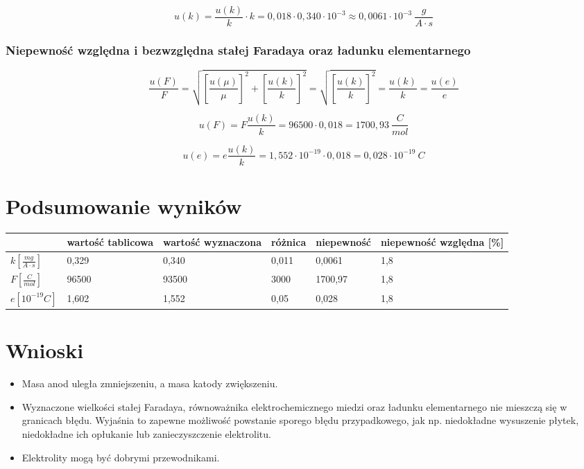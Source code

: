 \documentclass[a4paper,11pt]{article}
\begin{document}
$$
u(k) = \frac{u(k)}{k} \cdot k =  0,018 \cdot 0,340 \cdot 10^{-3} \approx 0,0061 \cdot 10^{-3} ~ \frac{g}{A \cdot s}
$$

\subsubsection*{Niepewność względna i bezwzględna  stałej Faradaya oraz ładunku elementarnego}

$$
\frac{u(F)}{F} = \sqrt{\left[\frac{u(\mu)}{\mu} \right]^2 + \left[\frac{u(k)}{k} \right]^2 } = \sqrt{\left[\frac{u(k)}{k} \right]^2 } = \frac{u(k)}{k}  =   \frac{u(e)}{e}
$$

$$
u(F) = F \frac{u(k)}{k}  =  96500  \cdot  0,018 = 1700,93  ~ \frac{C}{mol} 
$$

$$
u(e) = e \frac{u(k)}{k}  =  1,552 \cdot 10^{-19}  \cdot  0,018 = 0,028 \cdot 10^{-19} ~C 
$$

\section{Podsumowanie wyników}

\begin{tabular}{|l|p{2cm}|p{}| p{2cm}| p{2cm} | p{}|}
\hline  & wartość tablicowa  & wartość wyznaczona& różnica & niepewność  & niepewność względna [\%]  \\ 
\hline $k \left[  \frac{mg}{A \cdot s}\right]$ & 0,329  & 0,340  & 0,011 & 0,0061  & 1,8  \\ 
\hline $F \left[  \frac{C}{mol}\right]$ & 96500 & 93500  & 3000  & 1700,97  & 1,8  \\ 
\hline $e [10^{-19} C]$ & 1,602   & 1,552    & 0,05    & 0,028   & 1,8  \\ 
\hline 
\end{tabular} 

\section{Wnioski}
\begin{itemize}

\item Masa anod uległa zmniejszeniu, a masa katody zwiększeniu. 
\item Wyznaczone wielkości stałej Faradaya, równoważnika elektrochemicznego miedzi oraz ładunku elementarnego nie mieszczą się w granicach błędu. Wyjaśnia to zapewne możliwość powstanie sporego błędu przypadkowego, jak np. niedokładne wysuszenie płytek, niedokładne ich opłukanie lub zanieczyszczenie elektrolitu. 
\item Elektrolity mogą być dobrymi przewodnikami. 
 
\end{itemize}
\end{document}
